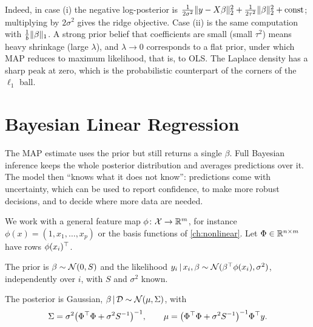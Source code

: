 Indeed, in case (i) the negative log-posterior is $\frac{1}{2\sigma^2}\lVert y-X\beta\rVert_2^2+\frac{1}{2\tau^2}\lVert \beta\rVert_2^2+\text{const}$; multiplying by $2\sigma^2$ gives the ridge objective. Case (ii) is the same computation with $\frac1b\lVert \beta\rVert_1$. A strong prior belief that coefficients are small (small $\tau^2$) means heavy shrinkage (large $\lambda$), and $\lambda\to0$ corresponds to a flat prior, under which MAP reduces to maximum likelihood, that is, to OLS. The Laplace density has a sharp peak at zero, which is the probabilistic counterpart of the corners of the $\ell_1$ ball.

\section{Bayesian Linear Regression}\label{sec:blr}

The MAP estimate uses the prior but still returns a single $\beta$. Full Bayesian inference keeps the whole posterior distribution and averages predictions over it. The model then ``knows what it does not know'': predictions come with uncertainty, which can be used to report confidence, to make more robust decisions, and to decide where more data are needed.

We work with a general feature map $\phi\colon\mathcal{X}\to\mathbb{R}^m$, for instance $\phi(x)=(1,x_1,\dots,x_p)$ or the basis functions of \cref{ch:nonlinear}. Let $\Phi\in\mathbb{R}^{n\times m}$ have rows $\phi(x_i)^{\top}$.

\begin{definition}\label{def:blr}
The prior is $\beta\sim\mathcal{N}(0,S)$ and the likelihood $y_i\,|\, x_i,\beta\sim\mathcal{N}(\beta^{\top}\phi(x_i),\sigma^2)$, independently over $i$, with $S$ and $\sigma^2$ known.
\end{definition}

\begin{proposition}[Posterior]\label{prop:blr-posterior}
The posterior is Gaussian, $\beta\,|\,\mathcal{D}\sim\mathcal{N}(\mu,\Sigma)$, with
\[
\Sigma=\sigma^2\big(\Phi^{\top}\Phi+\sigma^2S^{-1}\big)^{-1},\qquad
\mu=\big(\Phi^{\top}\Phi+\sigma^2S^{-1}\big)^{-1}\Phi^{\top} y .
\]
\end{proposition}

